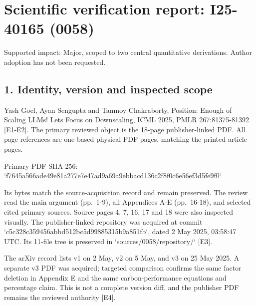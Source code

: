 \documentclass[10pt]{article}
\begin{document}
\section*{Scientific verification report: I25-40165 (0058)}
Supported impact: Major, scoped to two central quantitative derivations. Author adoption has not been requested.\par
\subsection*{1. Identity, version and inspected scope}
Yash Goel, Ayan Sengupta and Tanmoy Chakraborty, Position: Enough of Scaling LLMs! Lets Focus on Downscaling, ICML 2025, PMLR 267:81375-81392 [E1-E2]. The primary reviewed object is the 18-page publisher-linked PDF. All page references are one-based physical PDF pages, matching the printed article pages.\par
Primary PDF SHA-256:
`f7645a566ade49e81a277e7e47ad9a69a9ebbacd136c2f8f0c6e56ef3d5fe9f0`\par
Its bytes match the source-acquisition record and remain preserved. The review read the main argument (pp. 1-9), all Appendices A-E (pp. 16-18), and selected cited primary sources. Source pages 4, 7, 16, 17 and 18 were also inspected visually. The publisher-linked repository was acquired at commit `c5c328c359456abbd512bc5d99885315b9a851fb`, dated 2 May 2025, 03:58:47 UTC. Its 11-file tree is preserved in `sources/0058/repository/` [E3].\par
The arXiv record lists v1 on 2 May, v2 on 5 May, and v3 on 25 May 2025. A separate v3 PDF was acquired; targeted comparison confirms the same factor deletion in Appendix E and the same carbon-performance equations and percentage claim. This is not a complete version diff, and the publisher PDF remains the reviewed authority [E4].\par
\end{document}
